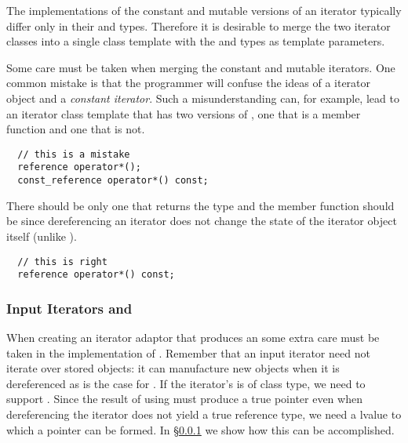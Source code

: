 \documentclass{netobjectdays}
\begin{document}

The implementations of the constant and mutable versions of an
iterator typically differ only in their  and
 types. Therefore it is desirable to merge the two
iterator classes into a single class template with the
 and  types as template parameters.

Some care must be taken when merging the constant and mutable
iterators.  One common mistake is that the programmer will confuse the
ideas of a  iterator object and a \emph{constant
iterator}. Such a misunderstanding can, for example, lead to an
iterator class template that has two versions of , one
that is a  member function and one that is not.
 
{\footnotesize
\begin{verbatim}
  // this is a mistake
  reference operator*();
  const_reference operator*() const;
\end{verbatim}
}

There should be only one  that returns the
 type and the member function should be  since
dereferencing an iterator does not change the state of the iterator
object itself (unlike ).

{\footnotesize
\begin{verbatim}
  // this is right
  reference operator*() const;
\end{verbatim}
}


\subsubsection{Input Iterators and }
\label{sec:operator-arrow}

When creating an iterator adaptor that produces an
 some extra care must be taken in the
implementation of . Remember that an input iterator
need not iterate over stored objects: it can manufacture new objects
when it is dereferenced as is the case for
. If the iterator's  is
of class type, we need to support . Since the result
of using  must produce a true pointer even when
dereferencing the iterator does not yield a true reference type, we
need a  lvalue to which a pointer can be formed.  In
\S\ref{sec:operator-arrow} we show how this can be accomplished.
\end{document}

